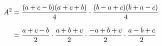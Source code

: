 \documentclass[preview]{standalone}
\begin{document}
\begin{align*}
\special{dvisvgm:raw <g id='unique000'>}A^2 &= \frac{(a + c - b)(a + c + b)}{4}\cdot \frac{(b - a + c)(b + a - c)}{4} \\[8pt] \special{dvisvgm:raw </g>}\special{dvisvgm:raw <g id='unique001'>}&= \frac{a + c - b}{2}\cdot\frac{a + b + c}{2}\cdot\frac{-a + b + c}{2}\cdot\frac{a - b + c}{2}\special{dvisvgm:raw </g>}
\end{align*}
\end{document}
